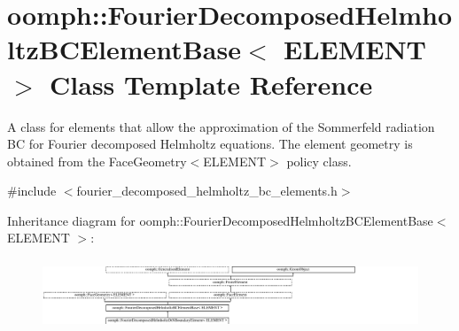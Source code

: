 \hypertarget{classoomph_1_1FourierDecomposedHelmholtzBCElementBase}{}\section{oomph\+:\+:Fourier\+Decomposed\+Helmholtz\+B\+C\+Element\+Base$<$ E\+L\+E\+M\+E\+NT $>$ Class Template Reference}
\label{classoomph_1_1FourierDecomposedHelmholtzBCElementBase}


A class for elements that allow the approximation of the Sommerfeld radiation BC for Fourier decomposed Helmholtz equations. The element geometry is obtained from the Face\+Geometry$<$\+E\+L\+E\+M\+E\+N\+T$>$ policy class.  




{\ttfamily \#include $<$fourier\+\_\+decomposed\+\_\+helmholtz\+\_\+bc\+\_\+elements.\+h$>$}

Inheritance diagram for oomph\+:\+:Fourier\+Decomposed\+Helmholtz\+B\+C\+Element\+Base$<$ E\+L\+E\+M\+E\+NT $>$\+:\begin{figure}[H]
\begin{center}
\leavevmode
\includegraphics[height=2.150538cm]{classoomph_1_1FourierDecomposedHelmholtzBCElementBase}
\end{center}
\end{figure}
